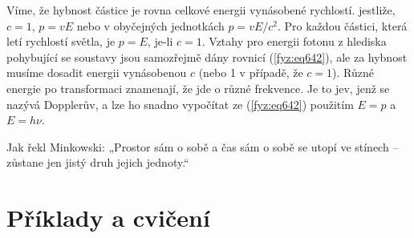     Víme, že hybnost částice je rovna celkové energii vynásobené rychlostí. jestliže, \(c=1\), \(p =
    vE\) nebo v obyčejných jednotkách \( p=vE/c^2\). Pro každou částici, která letí rychlostí
    světla, je \(p=E\), je-li \(c=1\). Vztahy pro energii fotonu z hlediska pohybující se soustavy
    jsou samozřejmě dány rovnicí (\ref {fyz:eq642}), ale za hybnost musíme dosadit energii
    vynásobenou \(c\) (nebo \num{1} v případě, že \(c=1\)). Různé energie po transformaci znamenají,
    že jde o různé frekvence. Je to jev, jenž se nazývá Dopplerův, a lze ho snadno vypočítat ze
    (\ref {fyz:eq642}) použitím \(E=p\) a \(E=hν\).

    Jak řekl Minkowski: „Prostor sám o sobě a čas sám o sobě se utopí ve stínech – zůstane jen jistý
    druh jejich jednoty.“

  \section{Příklady a cvičení}\label{fyz:IchapXVIIsecVI}
